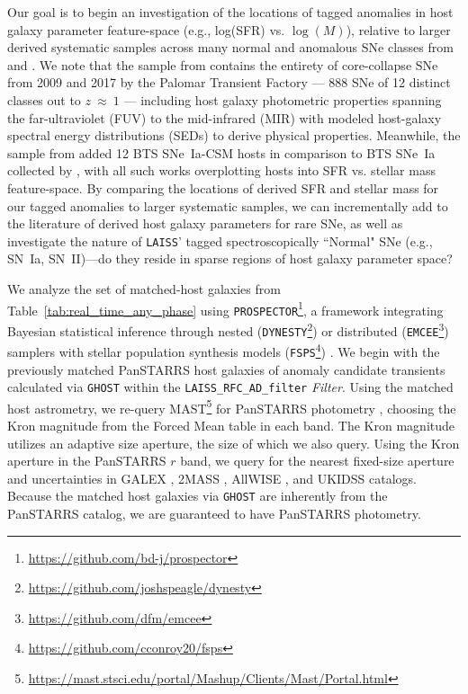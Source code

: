 \documentclass[twocolumn]{aastex63}
\newcommand{\laiss}{\texttt{LAISS}}
\begin{document}
Our goal is to begin an investigation of the locations of tagged anomalies in host galaxy parameter feature-space (e.g., log(SFR) vs. $\log(M)$), relative to larger derived systematic samples across many normal and anomalous SNe classes from \cite{PalomarHostModelingSchulze2021} and \cite{Sharma2023}. We note that the sample from \cite{PalomarHostModelingSchulze2021} contains the entirety of core-collapse SNe from 2009 and 2017 by the Palomar Transient Factory --- 888 SNe of 12 distinct classes out to $z~\approx~1$ --- including host galaxy photometric properties spanning the far-ultraviolet (FUV) to the mid-infrared (MIR) with modeled host-galaxy spectral energy distributions (SEDs) to derive physical properties. Meanwhile, the sample from \cite{Sharma2023} added 12 BTS SNe~Ia-CSM hosts in comparison to BTS SNe~Ia collected by \cite{Irani2022}, with all such works overplotting hosts into SFR vs. stellar mass feature-space. By comparing the locations of derived SFR and stellar mass for our tagged anomalies to larger systematic samples, we can incrementally add to the literature of derived host galaxy parameters for rare SNe, as well as investigate the nature of \laiss{}' tagged spectroscopically ``Normal" SNe (e.g., SN~Ia, SN~II)---do they reside in sparse regions of host galaxy parameter space?  \par

We analyze the set of matched-host galaxies from Table~\ref{tab:real_time_any_phase} using \texttt{PROSPECTOR}\footnote{\url{https://github.com/bd-j/prospector}}, a framework integrating Bayesian statistical inference through nested (\texttt{DYNESTY}\footnote{\url{https://github.com/joshspeagle/dynesty}}) or distributed (\texttt{EMCEE}\footnote{\url{https://github.com/dfm/emcee}}) samplers with stellar population synthesis models  (\texttt{FSPS}\footnote{\url{https://github.com/cconroy20/fsps}}) \citep{EMCEEForemanMackey2013,Prospector2Leja2017,Prospector1Johnson2021}. We begin with the previously matched PanSTARRS host galaxies of anomaly candidate transients calculated via \texttt{GHOST} \citep{Gagliano2021} within the \texttt{LAISS\_RFC\_AD\_filter} \textit{Filter}. Using the matched host astrometry, we re-query MAST\footnote{\url{https://mast.stsci.edu/portal/Mashup/Clients/Mast/Portal.html}} for PanSTARRS photometry \citep{Chambers2016}, choosing the Kron magnitude \cite{Kron1980} from the Forced Mean table in each band. The Kron magnitude utilizes an adaptive size aperture, the size of which we also query. Using the Kron aperture in the PanSTARRS $r$ band, we query for the nearest fixed-size aperture and uncertainties in GALEX \citep{Gezari13}, 2MASS \citep{Skrutskie2006-2MASS}, AllWISE \citep{Jarrett2011}, and UKIDSS \citep{Lawrence2007-UKIRT} catalogs. Because the matched host galaxies via \texttt{GHOST} are inherently from the PanSTARRS catalog, we are guaranteed to have PanSTARRS photometry. \par
\end{document}
